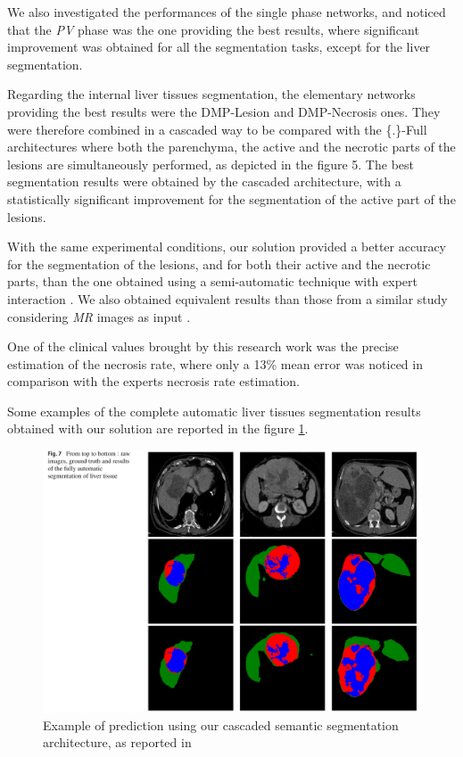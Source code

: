 \documentclass[]{article}
\begin{document}
We also investigated the performances of the single phase networks, and
noticed that the \emph{PV} phase was the one providing the best results,
where significant improvement was obtained for all the segmentation
tasks, except for the liver segmentation.

Regarding the internal liver tissues segmentation, the elementary
networks providing the best results were the DMP-Lesion and DMP-Necrosis
ones. They were therefore combined in a cascaded way to be compared with
the \{.\}-Full architectures where both the parenchyma, the active and
the necrotic parts of the lesions are simultaneously performed, as
depicted in the figure 5. The best segmentation results were obtained by
the cascaded architecture, with a statistically significant improvement
for the segmentation of the active part of the lesions.

With the same experimental conditions, our solution provided a better
accuracy for the segmentation of the lesions, and for both their active
and the necrotic parts, than the one obtained using a semi-automatic
technique with expert interaction \cite{Ouhmich2019}. We also
obtained equivalent results than those from a similar study considering
\emph{MR} images as input \cite{Zhang2018}.

One of the clinical values brought by this research work was the precise
estimation of the necrosis rate, where only a 13\% mean error was
noticed in comparison with the experts necrosis rate estimation.

Some examples of the complete automatic liver tissues
segmentation results obtained with our solution are reported in the figure \ref{pred_CARS}.


\begin{figure}[th!]
	\centering
	\includegraphics[width=0.7\linewidth]{images/image22}
	\caption{Example of prediction using our cascaded semantic segmentation architecture, as reported in \cite{Ouhmich2019}}
	\label{pred_CARS}
\end{figure}




\end{document}

